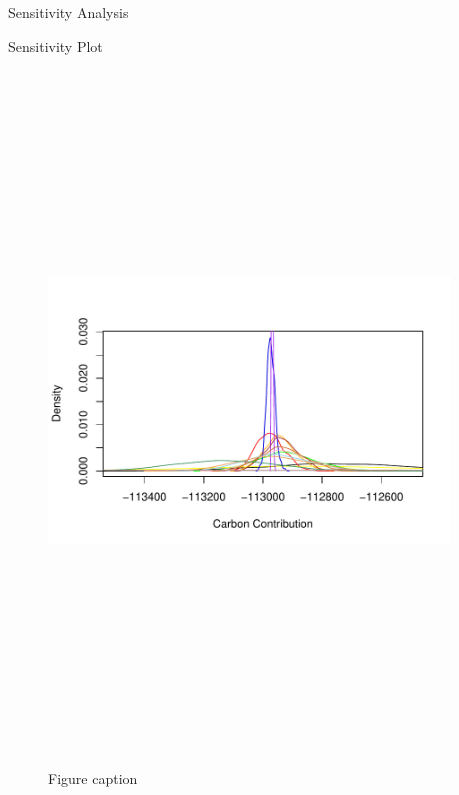 \documentclass[final]{beamer}\usepackage[]{graphicx}\usepackage[]{color}
\newlength{\onecolwid}
\newlength{\twocolwid}
\begin{document}
\begin{frame}[t]
\begin{columns}[t]
\begin{column}{\twocolwid}
\begin{columns}[t,totalwidth=\twocolwid]
\begin{column}{\onecolwid}
\begin{block}{Sensitivity Analysis}
\end{block}

\begin{block}{Sensitivity Plot}
\begin{center}
\begin{figure}
    {\includegraphics[width=1\linewidth,height=18cm]{CopyOfHLSensitivityGraph.pdf}}
    \caption{Figure caption}
\end{figure}
\end{center}
\end{block}


\end{column} %

\begin{column}{\onecolwid} %


\end{column}
\end{columns}
\end{column}
\end{columns}
\end{frame}
\end{document}

